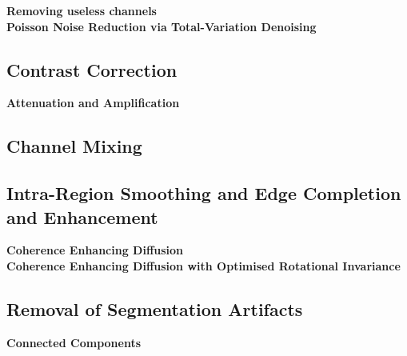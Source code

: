 \textbf{Removing useless channels}\\
\textbf{Poisson Noise Reduction via Total-Variation Denoising}


\subsection{Contrast Correction}
\label{sec:contrastcorrection}

\textbf{Attenuation and Amplification}


\subsection{Channel Mixing}
\label{sec:channelmixing}



\subsection{Intra-Region Smoothing and Edge Completion and Enhancement}
\label{sec:Diffusion}

\textbf{Coherence Enhancing Diffusion}\\
\textbf{Coherence Enhancing Diffusion with Optimised Rotational Invariance}


\subsection{Removal of Segmentation Artifacts}
\label{sec:RemovalArtifacts}

\textbf{Connected Components}


